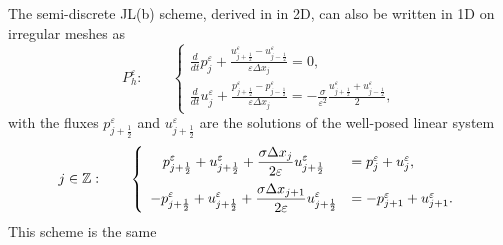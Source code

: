 \documentclass[a4paper,french,english,10pt]{article}
\newcommand\eps{\varepsilon}
\begin{document}
The semi-discrete
JL(b) scheme,   derived in  \cite{glaceap} in 2D,
can also be written in 1D on irregular meshes as 
\begin{equation}\label{schema1}
P^\varepsilon_h: \qquad
\left\{
\begin{array}{lll}
\displaystyle\frac{d}{dt}p^{\eps}_j +\frac{u_{j+\frac12 }^{\eps} -
u_{j-\frac12 }^{\eps} }{\eps\Delta x_j} = 0,\\
\displaystyle\frac{d}{dt}u^{\eps}_j+\frac{p_{j+\frac12 }^{\eps}-
p_{j-\frac12 }^{\eps}}{\eps\Delta x_j} = -\frac{\sigma}{\eps^2} \frac{
u_{j+\frac12 }^{\eps}+u_{j-\frac12 }^{\eps}}{2 } ,
\end{array}
\right.
\end{equation}
with  the fluxes  $p_{j+\frac12 }^{\eps}$ and $u_{j+\frac12 }^{\eps}$
are the solutions of the well-posed linear system
\begin{equation} \label{eq:fflux}
j\in \mathbb Z: \qquad
\left\{
\begin{array}{cl}
\displaystyle
p_{j+\frac12 }^{\eps}+u_{j+\frac12 }^{\eps}
+\frac{\sigma \Delta x_j}{2\eps}
 u_{j+\frac12 }^{\eps}
&=
p^{\eps}_j+u^{\eps}_j ,\vspace{2mm}
\\
\displaystyle
-p_{j+\frac12 }^{\eps} +u_{j+\frac12 }^{\eps}
+\frac{\sigma \Delta x_{j+1}}{2\eps} 
u_{j+\frac12 }^{\eps} 
&=
-p^{\eps}_{j+1}+u^{\eps}_{j+1}.
\end{array}
\right.
\end{equation}
This scheme is the same
\end{document}
